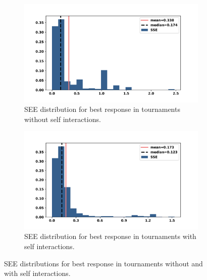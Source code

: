 \documentclass[10pt]{article}
\begin{document}
\begin{figure}[!htbp]
    \begin{subfigure}{0.47\textwidth}
        \begin{center}
            \includegraphics[width=\linewidth]{img/best_respones_sserror.pdf}
        \end{center}
        \caption{SEE distribution for best response in tournaments without self interactions.}
    \end{subfigure}\hfill
    \begin{subfigure}{0.47\textwidth}
        \begin{center}
            \includegraphics[width=\linewidth]{img/evo_sserror.pdf}
        \end{center}
        \caption{SEE distribution for best response in tournaments with self interactions.}
    \end{subfigure}
    \caption{SEE distributions for best response in tournaments without and with self interactions.}\label{fig:sse_distributions}
\end{figure}
\end{document}
